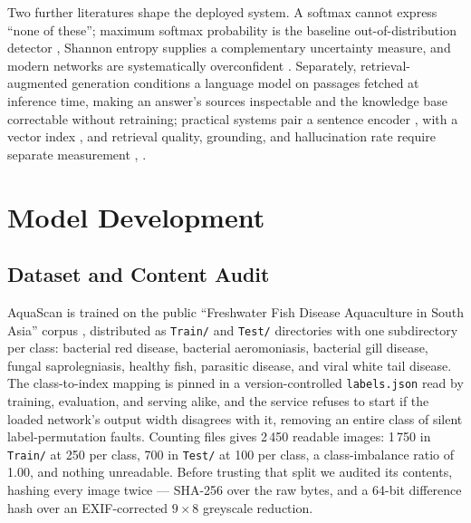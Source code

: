 \documentclass[conference]{IEEEtran}
\begin{document}
Two further literatures shape the deployed system. A softmax cannot express ``none of these''; maximum softmax probability is the baseline out-of-distribution detector \cite{b25}, Shannon entropy \cite{b24} supplies a complementary uncertainty measure, and modern networks are systematically overconfident \cite{b23}. Separately, retrieval-augmented generation \cite{b4} conditions a language model on passages fetched at inference time, making an answer's sources inspectable and the knowledge base correctable without retraining; practical systems pair a sentence encoder \cite{b5}, \cite{b37} with a vector index \cite{b6}, and retrieval quality, grounding, and hallucination rate require separate measurement \cite{b40}, \cite{b41}.

\section{Model Development}
\label{sec:model}

\subsection{Dataset and Content Audit}
\label{subsec:dataset}

AquaScan is trained on the public ``Freshwater Fish Disease Aquaculture in South Asia'' corpus \cite{b2}, distributed as \texttt{Train/} and \texttt{Test/} directories with one subdirectory per class: bacterial red disease, bacterial aeromoniasis, bacterial gill disease, fungal saprolegniasis, healthy fish, parasitic disease, and viral white tail disease. The class-to-index mapping is pinned in a version-controlled \texttt{labels.json} read by training, evaluation, and serving alike, and the service refuses to start if the loaded network's output width disagrees with it, removing an entire class of silent label-permutation faults. Counting files gives 2\,450 readable images: 1\,750 in \texttt{Train/} at 250 per class, 700 in \texttt{Test/} at 100 per class, a class-imbalance ratio of 1.00, and nothing unreadable. Before trusting that split we audited its contents, hashing every image twice --- SHA-256 over the raw bytes, and a 64-bit difference hash over an EXIF-corrected $9\times8$ greyscale reduction.
\end{document}
